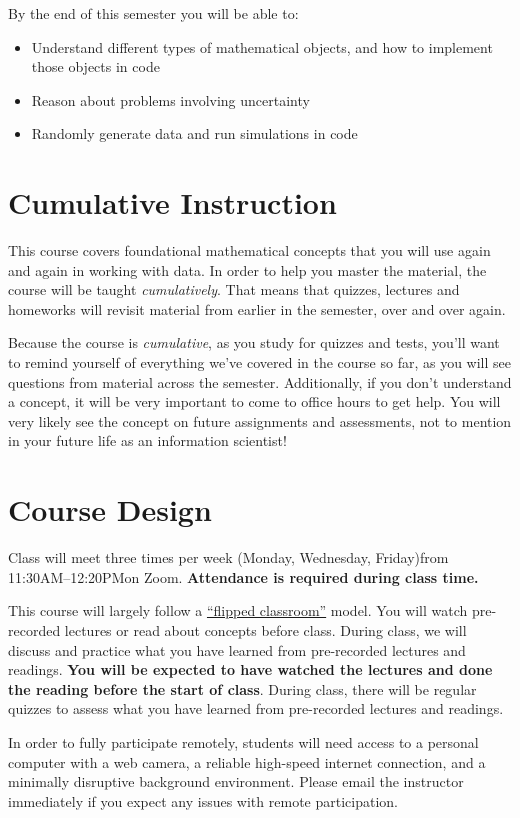 \documentclass[10pt]{memoir}
\def\mymeetingdays{Monday, Wednesday, Friday}
\def\mymeetingtimes{11:30AM--12:20PM}
\begin{document}
By the end of this semester you will be able to:
\begin{itemize}
\item Understand different types of mathematical objects, and how to implement those objects in code
\item Reason about problems involving uncertainty
\item Randomly generate data and run simulations in code
\end{itemize}

\section{\textbf{Cumulative Instruction}}

This course covers foundational mathematical concepts that you will use again and again in working with data. In order to help you master the material, the course will be taught \textit{cumulatively}. That means that quizzes, lectures and homeworks will revisit material from earlier in the semester, over and over again. 

Because the course is \textit{cumulative}, as you study for quizzes and tests, you'll want to remind yourself of everything we've covered in the course so far, as you will see questions from material across the semester. Additionally, if you don't understand a concept, it will be very important to come to office hours to get help. You will very likely see the concept on future assignments and assessments, not to mention in your future life as an information scientist!

\section{\textbf{Course Design}}
Class will meet three times per week (\mymeetingdays)\space from \mymeetingtimes\space on Zoom. \textbf{Attendance is required during class time.} 

This course will largely follow a \href{https://en.wikipedia.org/wiki/Flipped_classroom}{``flipped classroom''}  model. You will watch pre-recorded lectures or read about concepts before class. During class, we will discuss and practice what you have learned from pre-recorded lectures and readings. \textbf{You will be expected to have watched the lectures and done the reading before the start of class}. During class, there will be regular quizzes to assess what you have learned from pre-recorded lectures and readings. 

In order to fully participate remotely, students will need access to a personal computer with a web camera, a reliable high-speed internet connection, and a minimally disruptive background environment. Please email the instructor immediately if you expect any issues with remote participation.
\end{document}
